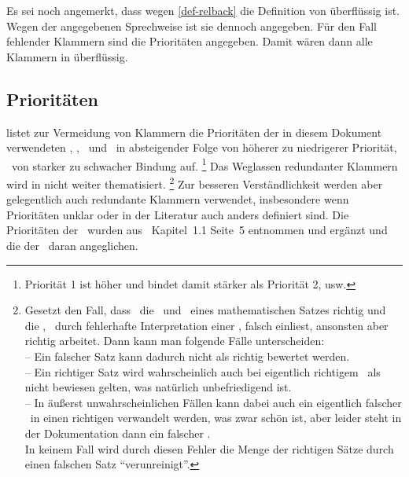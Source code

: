 Es sei noch angemerkt, dass wegen \eqref{def-relback} die Definition von \chrqt{\symmetarep}  überflüssig ist.
Wegen der angegebenen Sprechweise ist sie dennoch angegeben.
Für den Fall fehlender Klammern sind die Prioritäten  angegeben.
Damit wären dann alle Klammern in  überflüssig.

\subsection{Prioritäten}%
\label{sub-Prioritaeten}

 listet zur Vermeidung von Klammern die Prioritäten der in diesem Dokument verwendeten \Operationen, \Relationen, \Junktoren\ und \Definitionen\ in absteigender Folge von höherer zu niedrigerer Priorität, \textdh\ von starker zu schwacher Bindung auf.%
\footnote{Priorität 1 ist höher und bindet damit stärker als Priorität 2, usw.}
Das Weglassen redundanter Klammern wird in  nicht weiter thematisiert.%
\footnote{%
	Gesetzt den Fall, dass \ASBA\ die \Voraussetzungen\ und \Folgerungen\ eines mathematischen Satzes richtig und die \Beweisschritte, \textzB\ durch fehlerhafte Interpretation einer \Formel, falsch einliest, ansonsten aber richtig arbeitet.
	Dann kann man folgende Fälle unterscheiden:\\
	-- Ein falscher Satz kann dadurch nicht als richtig bewertet werden.\\
	-- Ein richtiger Satz wird wahrscheinlich auch bei eigentlich richtigem \Beweis\ als nicht bewiesen gelten, was natürlich unbefriedigend ist.\\
	-- In äußerst unwahrscheinlichen Fällen kann dabei auch ein eigentlich falscher \Beweis\ in einen richtigen verwandelt werden, was zwar schön ist, aber leider steht in der Dokumentation dann ein falscher \Beweis.\\
	In keinem Fall wird durch diesen Fehler die Menge der richtigen Sätze durch einen falschen Satz \enquote{verunreinigt}.
}
Zur besseren Verständlichkeit werden aber gelegentlich auch redundante Klammern verwendet, insbesondere wenn Prioritäten unklar oder in der Literatur auch anders definiert sind.
Die Prioritäten der \Junktoren\ wurden aus~\cite{bib:Rautenberg} Kapitel~1.1 Seite~5 entnommen und ergänzt und die der \Metaoperationen\ daran angeglichen.

